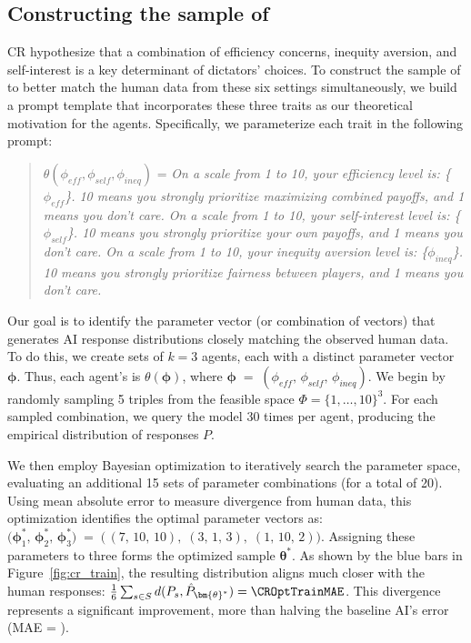 \subsection{Constructing the sample of }
\label{sec:apply_prompt}

CR hypothesize that a combination of efficiency concerns, inequity aversion, and self-interest is a key determinant of dictators' choices.
To construct the sample of  to better match the human data from these six settings simultaneously, we build a prompt template that incorporates these three traits as our theoretical motivation for the agents.
Specifically, we parameterize each trait in the following prompt: 
\begin{quote}
\vspace{-.5cm}
\singlespacing
$\theta(\phi_{eff}, \phi_{self}, \phi_{ineq})$ = \emph{On a scale from 1 to 10, your efficiency level is: \{\(\phi_{eff}\)\}. 
10 means you strongly prioritize maximizing combined payoffs, and 1 means you don't care.
On a scale from 1 to 10, your self-interest level is: \{\(\phi_{self}\)\}. 
10 means you strongly prioritize your own payoffs, and 1 means you don't care.
On a scale from 1 to 10, your inequity aversion level is: \{\(\phi_{ineq}\)\}. 
10 means you strongly prioritize fairness between players, and 1 means you don't care.}
\end{quote}

Our goal is to identify the parameter vector (or combination of vectors) that generates AI response distributions closely matching the observed human data.
To do this, we create sets of $k=3$ agents, each with a distinct parameter vector $\bm{\phi}$. 
Thus, each agent's \persona{} is $\theta(\bm{\phi})$, where
$\bm{\phi} \;=\; (\phi_{eff},\,\phi_{self},\,\phi_{ineq})$.
We begin by randomly sampling 5 triples from the feasible space $\Phi = \{1,\dots,10\}^3$.
For each sampled combination, we query the model 30 times per agent, producing the empirical distribution of responses $P$.

We then employ Bayesian optimization to iteratively search the parameter space, evaluating an additional 15 sets of parameter combinations (for a total of 20). 
Using mean absolute error to measure divergence from human data, this optimization identifies the optimal parameter vectors as:
$\bigl(\bm{\phi}_1^*,\,\bm{\phi}_2^*,\,\bm{\phi}_3^*\bigr) \;=\; \bigl(\,(7,\,10,\,10),\;(3,\,1,\,3),\;(1,\,10,\,2)\bigr)$.
Assigning these parameters to three  forms the optimized sample $\bm{\theta}^*$. 
As shown by the blue bars in Figure~\ref{fig:cr_train}, the resulting distribution aligns much closer with the human responses: $\frac{1}{6}\sum_{s \in S} d(P_s,\hat P_{\bm{\theta}^*})=\CROptTrainMAE$.
This divergence represents a significant improvement, more than halving the baseline AI's error (MAE = \CRBaselineTrainMAE).
